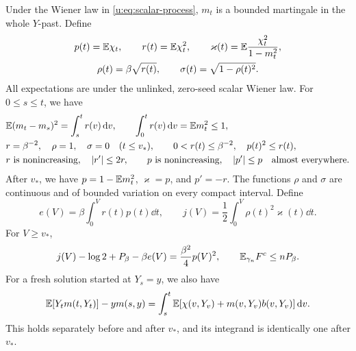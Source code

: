 \begin{proposition}\label{u:prop:scalar}
Under the Wiener law in \eqref{u:eq:scalar-process}, $m_t$ is a bounded
martingale in the whole $Y$-past. Define
\begin{equation}\label{u:eq:scalar-profiles}
\begin{gathered}
 p(t)=\mathbb E\chi_t,\qquad r(t)=\mathbb E\chi_t^2,\qquad
 \varkappa(t)=\mathbb E\frac{\chi_t^2}{1-m_t^2},\\
 \rho(t)=\beta\sqrt{r(t)},\qquad
 \sigma(t)=\sqrt{1-\rho(t)^2}.
\end{gathered}
\end{equation}
All expectations are under the unlinked, zero-seed scalar Wiener law.
For $0\le s\le t$, we have
\begin{align}
 &\mathbb E(m_t-m_s)^2=\int_s^t r(v)\,\mathrm d v,\qquad
   \int_0^t r(v)\,\mathrm d v=\mathbb E m_t^2\le1,
   \label{u:eq:scalar-variance}\\
 &r=\beta^{-2},\quad\rho=1,\quad\sigma=0\quad(t\le v_*),
   \qquad 0<r(t)\le\beta^{-2},\quad p(t)^2\le r(t),
   \label{u:eq:scalar-stationarity}\\
 &r\text{ is nonincreasing},\quad |r'|\le2r,\qquad
   p\text{ is nonincreasing},\quad |p'|\le p
   \quad\text{almost everywhere}.
   \label{u:eq:profile-variation}
\end{align}
After $v_*$, we have $p=1-\mathbb E m_t^2$, $\varkappa=p$, and $p'=-r$.
The functions $\rho$ and $\sigma$ are continuous and of bounded
variation on every compact interval. Define
\begin{equation}\label{u:eq:scalar-energy-information}
 e(V)=\beta\int_0^V r(t)p(t)\dd t,\qquad
 j(V)=\frac12\int_0^V\rho(t)^2\varkappa(t)\dd t.
\end{equation}
For $V\ge v_*$,
\begin{equation}\label{u:eq:scalar-balance}
 j(V)-\log2+P_\beta-\beta e(V)=\frac{\beta^2}{4}p(V)^2,
 \qquad \mathbb E_{\gamma_n}F^c\le nP_\beta.
\end{equation}
For a fresh solution started at $Y_s=y$, we also have
\begin{equation}\label{u:eq:restart-coordinate}
 \mathbb E[Y_t m(t,Y_t)]-ym(s,y)
 =\int_s^t\mathbb E[\chi(v,Y_v)+m(v,Y_v)b(v,Y_v)]\,\mathrm d v.
\end{equation}
This holds separately before and after $v_*$, and its integrand is
identically one after $v_*$.
\end{proposition}

